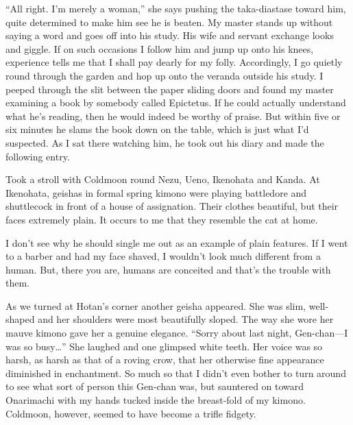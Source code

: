 \documentclass{book}
\begin{document}
``All right. I'm merely a woman,'' she says pushing the taka-diastase
toward him, quite determined to make him see he is beaten. My master
stands up without saying a word and goes off into his study. His wife
and servant exchange looks and giggle. If on such occasions I follow him
and jump up onto his knees, experience tells me that I shall pay dearly
for my folly. Accordingly, I go quietly round through the garden and hop
up onto the veranda outside his study. I peeped through the slit between
the paper sliding doors and found my master examining a book by somebody
called Epictetus. If he could actually understand what he's reading,
then he would indeed be worthy of praise. But within five or six minutes
he slams the book down on the table, which is just what I'd suspected.
As I sat there watching him, he took out his diary and made the
following entry.

Took a stroll with Coldmoon round Nezu, Ueno, Ikenohata and Kanda. At
Ikenohata, geishas in formal spring kimono were playing battledore and
shuttlecock in front of a house of assignation. Their clothes beautiful,
but their faces extremely plain. It occurs to me that they resemble the
cat at home.

I don't see why he should single me out as an example of plain features.
If I went to a barber and had my face shaved, I wouldn't look much
different from a human. But, there you are, humans are conceited and
that's the trouble with them.

As we turned at Hotan's corner another geisha appeared. She was slim,
well-shaped and her shoulders were most beautifully sloped. The way she
wore her mauve kimono gave her a genuine elegance. ``Sorry about last
night, Gen-chan---I was so busy\ldots{}'' She laughed and one glimpsed
white teeth. Her voice was so harsh, as harsh as that of a roving crow,
that her otherwise fine appearance diminished in enchantment. So much so
that I didn't even bother to turn around to see what sort of person this
Gen-chan was, but sauntered on toward Onarimachi with my hands tucked
inside the breast-fold of my kimono. Coldmoon, however, seemed to have
become a trifle fidgety.
\end{document}

